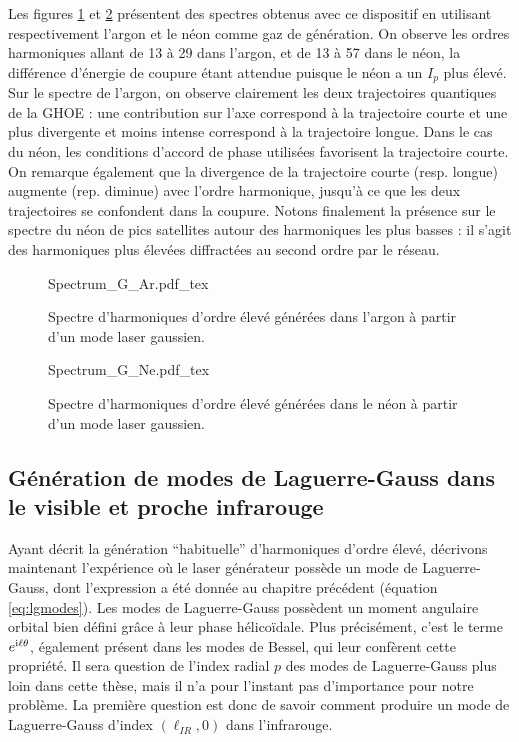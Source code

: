 Les figures \ref{Fig:SpectrumGAr} et \ref{Fig:SpectrumGNe} présentent des spectres obtenus avec ce dispositif en utilisant respectivement l'argon et le néon comme gaz de génération. On observe les ordres harmoniques allant de 13 à 29 dans l'argon, et de 13 à 57 dans le néon, la différence d'énergie de coupure étant attendue puisque le néon a un $I_p$ plus élevé. Sur le spectre de l'argon, on observe clairement les deux trajectoires quantiques de la GHOE : une contribution sur l'axe correspond à la trajectoire courte et une plus divergente et moins intense correspond à la trajectoire longue. Dans le cas du néon, les conditions d'accord de phase utilisées favorisent la trajectoire courte. On remarque également que la divergence de la trajectoire courte (resp. longue) augmente (rep. diminue) avec l'ordre harmonique, jusqu'à ce que les deux trajectoires se confondent dans la coupure. Notons finalement la présence sur le spectre du néon de pics satellites autour des harmoniques les plus basses : il s'agit des harmoniques plus élevées diffractées au second ordre par le réseau.
\begin{figure}[!ht]
\centering
\def\svgwidth{\columnwidth}
{Spectrum_G_Ar.pdf_tex}
\caption{Spectre d'harmoniques d'ordre élevé générées dans l'argon à partir d'un mode laser gaussien.}
\label{Fig:SpectrumGAr}
\end{figure}
\begin{figure}[!ht]
\centering
\def\svgwidth{\columnwidth}
{Spectrum_G_Ne.pdf_tex}
\caption{Spectre d'harmoniques d'ordre élevé générées dans le néon à partir d'un mode laser gaussien.}
\label{Fig:SpectrumGNe}
\end{figure}

\subsection{Génération de modes de Laguerre-Gauss dans le visible et proche infrarouge}
Ayant décrit la génération ``habituelle'' d'harmoniques d'ordre élevé, décrivons maintenant l'expérience où le laser générateur possède un mode de Laguerre-Gauss, dont l'expression a été donnée au chapitre précédent (équation \ref{eq:lgmodes}). Les modes de Laguerre-Gauss possèdent un moment angulaire orbital bien défini grâce à leur phase hélicoïdale. Plus précisément, c'est le terme $e^{\mathrm{i}\ell\theta}$, également présent dans les modes de Bessel, qui leur confèrent cette propriété. Il sera question de l'index radial $p$ des modes de Laguerre-Gauss plus loin dans cette thèse, mais il n'a pour l'instant pas d'importance pour notre problème. La première question est donc de savoir comment produire un mode de Laguerre-Gauss d'index $(\ell_{IR},0)$ dans l'infrarouge. 

